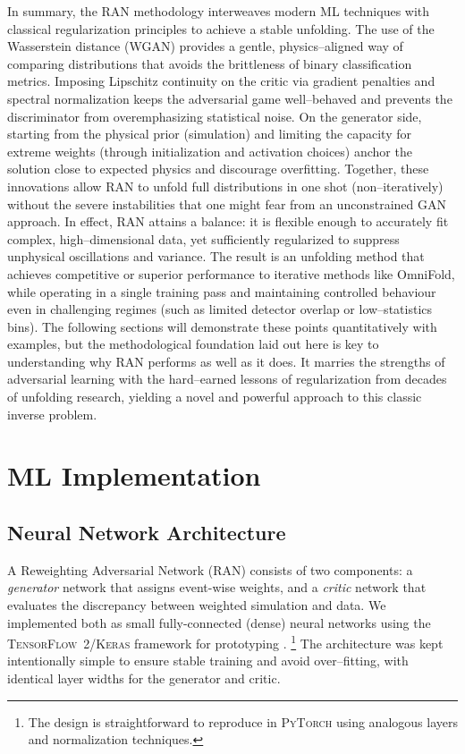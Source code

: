     In summary, the RAN methodology interweaves modern ML techniques with classical regularization principles to achieve a stable unfolding.
    The use of the Wasserstein distance (WGAN) provides a gentle, physics--aligned way of comparing distributions that avoids the brittleness of binary classification metrics.
    Imposing Lipschitz continuity on the critic via gradient penalties and spectral normalization keeps the adversarial game well--behaved and prevents the discriminator from overemphasizing statistical noise.
    On the generator side, starting from the physical prior (simulation) and limiting the capacity for extreme weights (through initialization and activation choices) anchor the solution close to expected physics and discourage overfitting.
    Together, these innovations allow RAN to unfold full distributions in one shot (non--iteratively) without the severe instabilities that one might fear from an unconstrained GAN approach.
    In effect, RAN attains a balance: it is flexible enough to accurately fit complex, high--dimensional data, yet sufficiently regularized to suppress unphysical oscillations and variance.
    The result is an unfolding method that achieves competitive or superior performance to iterative methods like OmniFold, while operating in a single training pass and maintaining controlled behaviour even in challenging regimes (such as limited detector overlap or low--statistics bins).
    The following sections will demonstrate these points quantitatively with examples, but the methodological foundation laid out here is key to understanding why RAN performs as well as it does.
    It marries the strengths of adversarial learning with the hard--earned lessons of regularization from decades of unfolding research, yielding a novel and powerful approach to this classic inverse problem.
\section{ML Implementation}
    \subsection{Neural Network Architecture}
        A Reweighting Adversarial Network (RAN) consists of two components: a \emph{generator} network that assigns event-wise weights, and a \emph{critic} network that evaluates the discrepancy between weighted simulation and data.
        We implemented both as small fully-connected (dense) neural networks using the \textsc{TensorFlow~2/Keras} framework for prototyping .
        \footnote{The design is straightforward to reproduce in \textsc{PyTorch} using analogous layers and normalization techniques.}
        The architecture was kept intentionally simple to ensure stable training and avoid over--fitting, with identical layer widths for the generator and critic.

